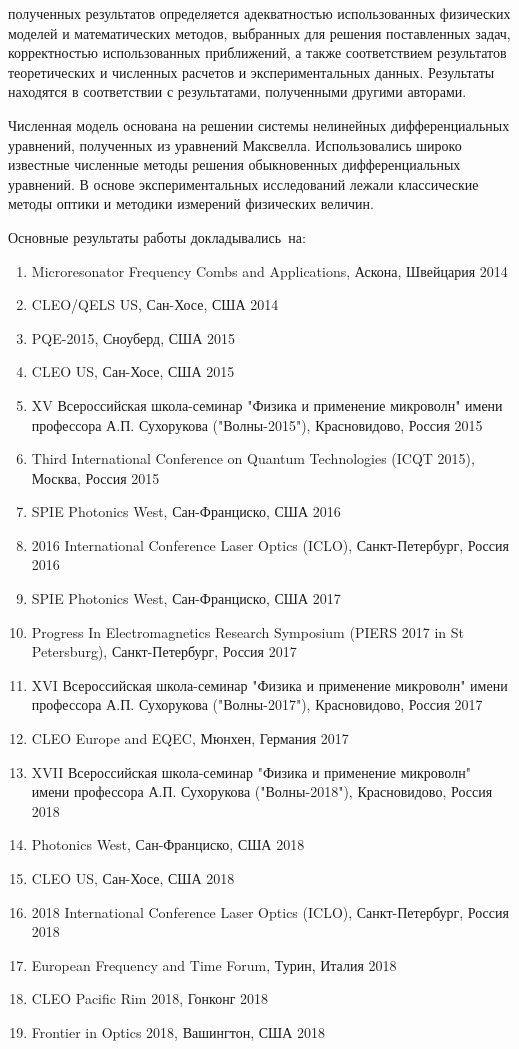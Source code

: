 {\reliability} полученных результатов определяется адекватностью использованных физических моделей и математических методов, выбранных для решения поставленных задач, корректностью использованных приближений, а также
соответствием результатов теоретических и численных расчетов и экспериментальных данных. Результаты находятся в соответствии с результатами, полученными другими авторами.

Численная модель основана на решении системы нелинейных дифференциальных уравнений, полученных из уравнений Максвелла. Использовались широко известные численные методы решения обыкновенных дифференциальных уравнений. В основе экспериментальных исследований лежали классические методы оптики и методики измерений физических величин.

{\probation}
Основные результаты работы докладывались~на:
\begin{enumerate}
  \item Microresonator Frequency Combs and Applications, Аскона, Швейцария 2014
  \item CLEO/QELS US, Сан-Хосе, США 2014
  \item PQE-2015, Сноуберд, США 2015
  \item CLEO US, Сан-Хосе, США 2015
  \item XV Всероссийская школа-семинар "Физика и применение микроволн" имени профессора А.П. Сухорукова ("Волны-2015"), Красновидово, Россия 2015
  \item Third International Conference on Quantum Technologies (ICQT 2015), Москва, Россия 2015
  \item SPIE Photonics West, Сан-Франциско, США 2016
  \item 2016 International Conference Laser Optics (ICLO), Санкт-Петербург, Россия 2016
  \item SPIE Photonics West, Сан-Франциско, США 2017
  \item Progress In Electromagnetics Research Symposium (PIERS 2017 in St Petersburg), Санкт-Петербург, Россия 2017
  \item XVI Всероссийская школа-семинар "Физика и применение микроволн" имени профессора А.П. Сухорукова ("Волны-2017"), Красновидово, Россия 2017
  \item CLEO Europe and EQEC, Мюнхен, Германия 2017
  \item XVII Всероссийская школа-семинар "Физика и применение микроволн" имени профессора А.П. Сухорукова ("Волны-2018"), Красновидово, Россия 2018
  \item Photonics West, Сан-Франциско, США 2018
  \item CLEO US, Сан-Хосе, США 2018
  \item 2018 International Conference Laser Optics (ICLO), Санкт-Петербург, Россия 2018
  \item European Frequency and Time Forum, Турин, Италия 2018
  \item CLEO Pacific Rim 2018, Гонконг 2018
  \item Frontier in Optics 2018, Вашингтон, США 2018
\end{enumerate}


